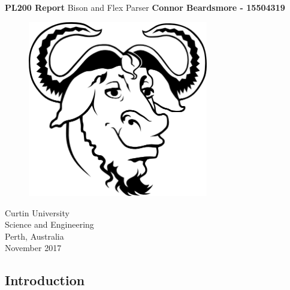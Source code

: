 \documentclass[]{article}
\begin{document}


	

\begin{titlepage}
	\begin{center}
		\vspace*{1cm}
		\LARGE\textbf{PL200 Report}
		\break
		Bison and Flex Parser
		\vspace{1cm}
		\break
		\Large\textbf{Connor Beardsmore - 15504319} 
		\vspace{2cm}
		\begin{figure}[H]
			\begin{center}
				{ 
					\includegraphics[height=0.4\textheight,width=0.7\textwidth]{placeholder.png}}
			\end{center}
		\end{figure}
		
		\vspace{4cm}
		\normalsize
		Curtin University \\
		Science and Engineering \\
		Perth, Australia \\
		November 2017
		
	\end{center}
\end{titlepage}


\begin{center}
	\section*{Introduction}
\end{center}
\end{document}
